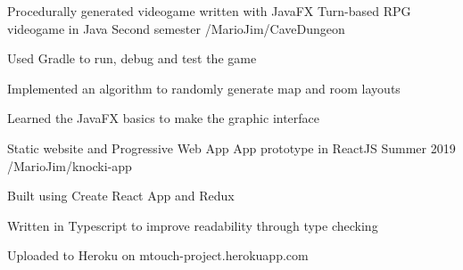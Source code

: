 

\begin{cventries}

\cventry
    {Procedurally generated videogame written with JavaFX} %
    {Turn-based RPG videogame in Java} %
    {Second semester} %
    {\faGithub/MarioJim/CaveDungeon}
    {
      \begin{cvitems} %
        \item {Used Gradle to run, debug and test the game}
        \item {Implemented an algorithm to randomly generate map and room layouts}
        \item {Learned the JavaFX basics to make the graphic interface}
      \end{cvitems}
    }
\cventry
    {Static website and Progressive Web App} %
    {App prototype in ReactJS} %
    {Summer 2019} %
    {\faGithub/MarioJim/knocki-app}
    {
      \begin{cvitems} %
        \item {Built using Create React App and Redux}
        \item {Written in Typescript to improve readability through type checking}
        \item {Uploaded to Heroku on mtouch-project.herokuapp.com}
      \end{cvitems}
    }

\end{cventries}
